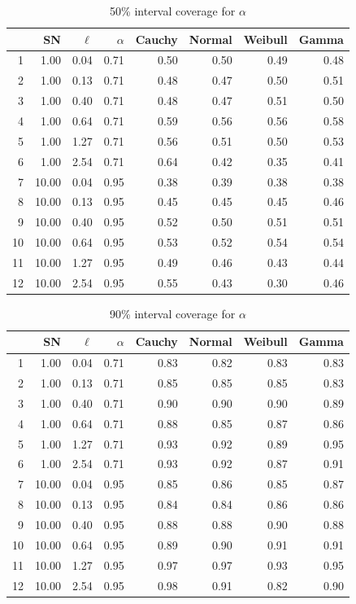 \documentclass{article}
\begin{document}
\begin{table}[htbp]
\centering
\caption {50\% interval coverage for $\alpha$} \label{50_cover_alpha} 
\begin{tabular}{rrrrrrrr}
  \hline
 & SN & $\ell$ & $\alpha$ & Cauchy & Normal & Weibull & Gamma \\ 
  \hline
1 & 1.00 & 0.04 & 0.71 & 0.50 & 0.50 & 0.49 & 0.48 \\ 
  2 & 1.00 & 0.13 & 0.71 & 0.48 & 0.47 & 0.50 & 0.51 \\ 
  3 & 1.00 & 0.40 & 0.71 & 0.48 & 0.47 & 0.51 & 0.50 \\ 
  4 & 1.00 & 0.64 & 0.71 & 0.59 & 0.56 & 0.56 & 0.58 \\ 
  5 & 1.00 & 1.27 & 0.71 & 0.56 & 0.51 & 0.50 & 0.53 \\ 
  6 & 1.00 & 2.54 & 0.71 & 0.64 & 0.42 & 0.35 & 0.41 \\ 
  7 & 10.00 & 0.04 & 0.95 & 0.38 & 0.39 & 0.38 & 0.38 \\ 
  8 & 10.00 & 0.13 & 0.95 & 0.45 & 0.45 & 0.45 & 0.46 \\ 
  9 & 10.00 & 0.40 & 0.95 & 0.52 & 0.50 & 0.51 & 0.51 \\ 
  10 & 10.00 & 0.64 & 0.95 & 0.53 & 0.52 & 0.54 & 0.54 \\ 
  11 & 10.00 & 1.27 & 0.95 & 0.49 & 0.46 & 0.43 & 0.44 \\ 
  12 & 10.00 & 2.54 & 0.95 & 0.55 & 0.43 & 0.30 & 0.46 \\ 
   \hline
\end{tabular}
\end{table}

\begin{table}[htbp]
\centering
\caption {90\% interval coverage for $\alpha$} \label{90_cover_alpha} 
\begin{tabular}{rrrrrrrr}
  \hline
 & SN & $\ell$ & $\alpha$ & Cauchy & Normal & Weibull & Gamma \\ 
  \hline
1 & 1.00 & 0.04 & 0.71 & 0.83 & 0.82 & 0.83 & 0.83 \\ 
  2 & 1.00 & 0.13 & 0.71 & 0.85 & 0.85 & 0.85 & 0.83 \\ 
  3 & 1.00 & 0.40 & 0.71 & 0.90 & 0.90 & 0.90 & 0.89 \\ 
  4 & 1.00 & 0.64 & 0.71 & 0.88 & 0.85 & 0.87 & 0.86 \\ 
  5 & 1.00 & 1.27 & 0.71 & 0.93 & 0.92 & 0.89 & 0.95 \\ 
  6 & 1.00 & 2.54 & 0.71 & 0.93 & 0.92 & 0.87 & 0.91 \\ 
  7 & 10.00 & 0.04 & 0.95 & 0.85 & 0.86 & 0.85 & 0.87 \\ 
  8 & 10.00 & 0.13 & 0.95 & 0.84 & 0.84 & 0.86 & 0.86 \\ 
  9 & 10.00 & 0.40 & 0.95 & 0.88 & 0.88 & 0.90 & 0.88 \\ 
  10 & 10.00 & 0.64 & 0.95 & 0.89 & 0.90 & 0.91 & 0.91 \\ 
  11 & 10.00 & 1.27 & 0.95 & 0.97 & 0.97 & 0.93 & 0.95 \\ 
  12 & 10.00 & 2.54 & 0.95 & 0.98 & 0.91 & 0.82 & 0.90 \\ 
   \hline
\end{tabular}
\end{table}
\end{document}
